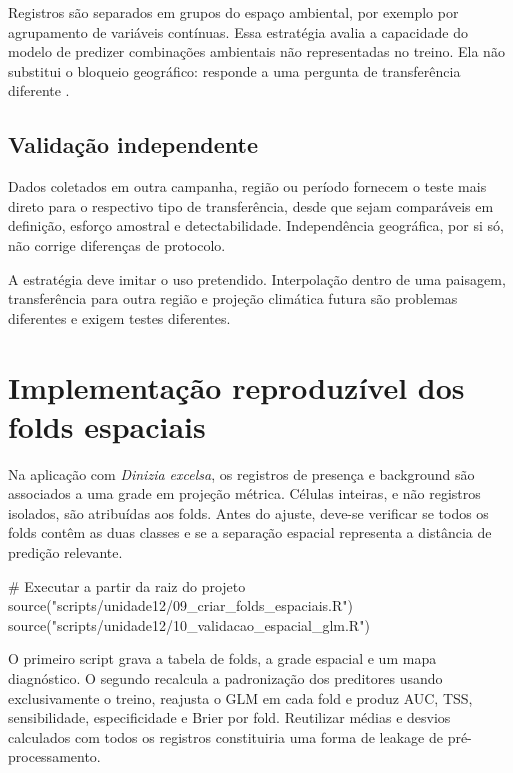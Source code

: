 Registros são separados em grupos do espaço ambiental, por exemplo por
agrupamento de variáveis contínuas. Essa estratégia avalia a capacidade do
modelo de predizer combinações ambientais não representadas no treino. Ela não
substitui o bloqueio geográfico: responde a uma pergunta de transferência
diferente \parencite{valavi2019blockcv}.

\subsection{Validação independente}

Dados coletados em outra campanha, região ou período fornecem o teste mais
direto para o respectivo tipo de transferência, desde que sejam comparáveis em
definição, esforço amostral e detectabilidade. Independência geográfica, por si
só, não corrige diferenças de protocolo.

\begin{atencao}[title={\faExclamationTriangle\quad Não existe uma partição universalmente melhor}]
	A estratégia deve imitar o uso pretendido. Interpolação dentro de uma paisagem,
	transferência para outra região e projeção climática futura são problemas
	diferentes e exigem testes diferentes.
\end{atencao}

\section{Implementação reproduzível dos folds espaciais}

Na aplicação com \textit{Dinizia excelsa}, os registros de presença e background
são associados a uma grade em projeção métrica. Células inteiras, e não registros
isolados, são atribuídas aos folds. Antes do ajuste, deve-se verificar se todos os
folds contêm as duas classes e se a separação espacial representa a distância de
predição relevante.

\begin{rcode}
# Executar a partir da raiz do projeto
source("scripts/unidade12/09_criar_folds_espaciais.R")
source("scripts/unidade12/10_validacao_espacial_glm.R")
\end{rcode}



O primeiro script grava a tabela de folds, a grade espacial e um mapa diagnóstico.
O segundo recalcula a padronização dos preditores usando exclusivamente o treino,
reajusta o GLM em cada fold e produz AUC, TSS, sensibilidade, especificidade e
Brier por fold. Reutilizar médias e desvios calculados com todos os registros
constituiria uma forma de leakage de pré-processamento.

